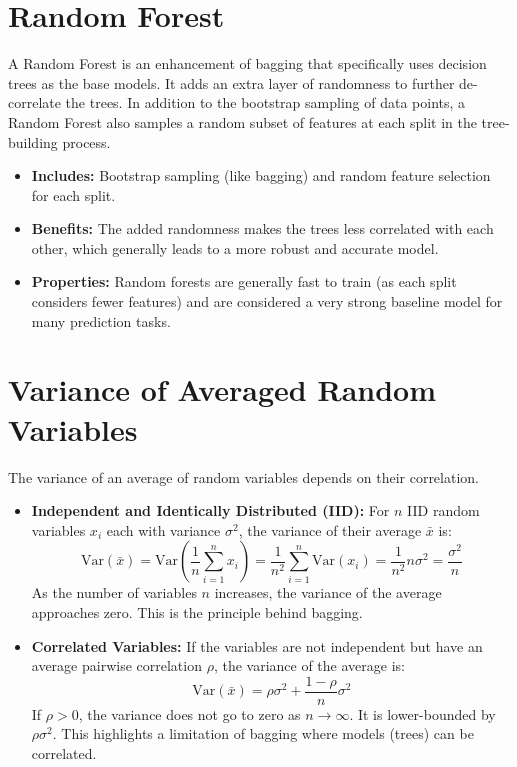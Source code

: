 \documentclass{article}
\begin{document}
\begin{multicols}{2}
\section{Random Forest}
A Random Forest is an enhancement of bagging that specifically uses decision trees as the base models. It adds an extra layer of randomness to further de-correlate the trees.
In addition to the bootstrap sampling of data points, a Random Forest also samples a random subset of features at each split in the tree-building process.
\begin{itemize}
    \item \textbf{Includes:} Bootstrap sampling (like bagging) and random feature selection for each split.
    \item \textbf{Benefits:} The added randomness makes the trees less correlated with each other, which generally leads to a more robust and accurate model.
    \item \textbf{Properties:} Random forests are generally fast to train (as each split considers fewer features) and are considered a very strong baseline model for many prediction tasks.
\end{itemize}


\section{Variance of Averaged Random Variables}
The variance of an average of random variables depends on their correlation.

\begin{itemize}
    \item \textbf{Independent and Identically Distributed (IID):} For $n$ IID random variables $x_i$ each with variance $\sigma^2$, the variance of their average $\bar{x}$ is:
    $$ \text{Var}(\bar{x}) = \text{Var}\left(\frac{1}{n}\sum_{i=1}^{n} x_i\right) = \frac{1}{n^2}\sum_{i=1}^{n}\text{Var}(x_i) = \frac{1}{n^2} n\sigma^2 = \frac{\sigma^2}{n} $$
    As the number of variables $n$ increases, the variance of the average approaches zero. This is the principle behind bagging.

    \item \textbf{Correlated Variables:} If the variables are not independent but have an average pairwise correlation $\rho$, the variance of the average is:
    $$ \text{Var}(\bar{x}) = \rho\sigma^2 + \frac{1-\rho}{n}\sigma^2 $$
    If $\rho > 0$, the variance does not go to zero as $n \to \infty$. It is lower-bounded by $\rho\sigma^2$. This highlights a limitation of bagging where models (trees) can be correlated.
\end{itemize}


\end{multicols}
\end{document}
